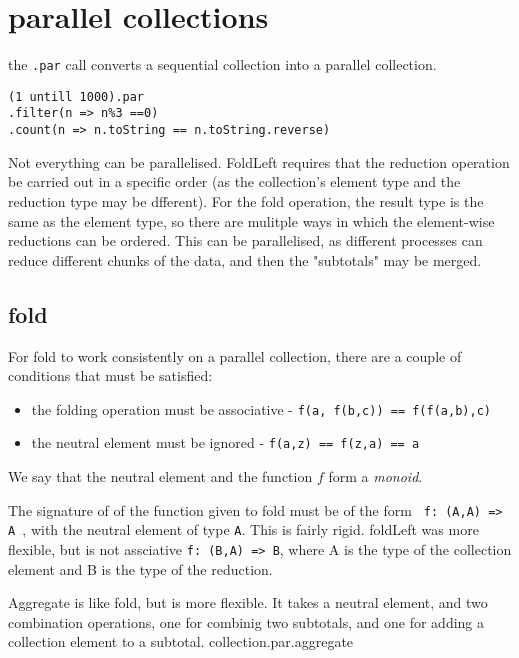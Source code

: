 \section{parallel collections}

the \lstinline|.par| call converts a sequential collection into a parallel collection.
\begin{lstlisting}
(1 untill 1000).par
.filter(n => n%3 ==0)
.count(n => n.toString == n.toString.reverse)
\end{lstlisting}

Not everything can be parallelised. FoldLeft requires that the reduction operation be carried out in a specific order (as the collection's element type and the reduction type may be dfferent). For the fold operation, the result type is the same as the element type, so there are mulitple ways in which the element-wise reductions can be ordered. This can be parallelised, as different processes can reduce different chunks of the data, and then the "subtotals" may be merged.


\subsection{fold}
For fold to work consistently on a parallel collection, there are a couple of conditions that must be satisfied:
\begin{itemize}
    \item the folding operation must be associative - \lstinline|f(a, f(b,c)) == f(f(a,b),c)|
    \item the neutral element must be ignored - \lstinline|f(a,z) == f(z,a) == a|
\end{itemize}
We say that the neutral element and the function $f$ form a { \em monoid}.

The signature of of the function given to fold must be of the form \lstinline| f: (A,A) => A |, with the neutral element of type \lstinline|A|. This is fairly rigid. foldLeft was more flexible, but is not assciative \lstinline|f: (B,A) => B|, where A is the type of the collection element and B is the type of the reduction.

Aggregate is like fold, but is more flexible. It takes a neutral element, and two combination operations, one for combinig two subtotals, and one for adding a collection element to a subtotal.
collection.par.aggregate